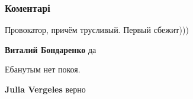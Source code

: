  
 
 
 
 
\subsubsection{Коментарі}
\label{sec:06_08_2021.fb.andre_lom.1.mova_ombudsmen.cmt}

\begin{itemize}
 
Провокатор, причём трусливый. Первый сбежит)))

\begin{itemize}
 
\textbf{Виталий Бондаренко} да
\end{itemize}

 
Ебанутым нет покоя.

\begin{itemize}
 
\textbf{Julia Vergeles} верно
\end{itemize}

 

\end{itemize}
